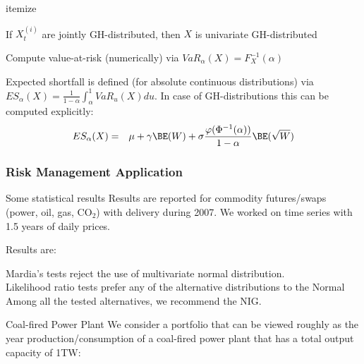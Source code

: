 


{itemize}

	If $X_t^{(i)}$ are jointly GH-distributed, then $X$ is
univariate GH-distributed

	Compute value-at-risk
(numerically) via $ VaR_{\alpha}(X)=F^{-1}_X(\alpha) $

Expected shortfall is defined (for absolute continuous
distributions) via $ ES_{\alpha}(X)
=\frac{1}{1-\alpha}\int_{\alpha}^1VaR_u(X)du$. In case of
GH-distributions this can be computed explicitly:
\begin{eqnarray*}
ES_{\alpha}(X)&=&\mu+\gamma\BE(W)+\sigma\frac{\varphi(\Phi^{-1}(\alpha))}{1-\alpha}\BE(\sqrt{W})
\end{eqnarray*}






\subsubsection{Risk Management Application}

{Some statistical results} %
Results are reported for commodity futures/swaps (power, oil, gas,
CO$_2$) with delivery during 2007. We worked on time series with
1.5 years of daily prices.

Results are: %






	Mardia's tests reject the use of multivariate normal distribution.\\[-1.3cm]

	Likelihood ratio tests prefer any of the alternative distributions to the Normal\\[-1.3cm]

	Among all the tested alternatives, we recommend the NIG.






{Coal-fired Power Plant} We consider a portfolio
that can be viewed roughly as the year production/consumption of a
coal-fired power plant that has a total output capacity of 1TW:



